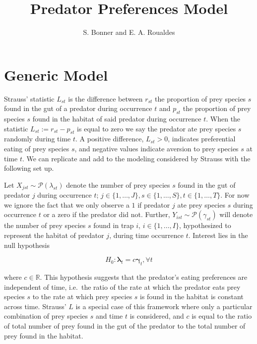 \documentclass[12pt]{article}\usepackage[]{graphicx}\usepackage[]{color}
\begin{document}
\title{Predator Preferences Model}
\author{S. Bonner and E. A. Roualdes}
\maketitle 



\section{Generic Model}
Strauss' statistic $L_{st}$ \cite{Strauss:1979} is the difference between $r_{st}$ the proportion of prey species $s$ found in the gut of a predator during occurrence $t$ and $p_{st}$ the proportion of prey species $s$ found in the habitat of said predator during occurrence $t$.  When the statistic $L_{st} := r_{st} - p_{st}$ is equal to zero we say the predator ate prey species $s$ randomly during time $t$.  A positive difference, $L_{st} > 0$, indicates preferential eating of prey species $s$, and negative values indicate aversion to prey species $s$ at time $t$.  We can replicate and add to the modeling considered by Strauss with the following set up.

Let $X_{jst} \sim \mathcal{P}(\lambda_{st})$ denote the number of prey species $s$ found in the gut of predator $j$ during occurrence $t$; $j \in \{1, \ldots, J\}, s \in \{1, \ldots, S\}, t \in \{1, \ldots, T\}$.  For now we ignore the fact that we only observe a $1$ if predator $j$ ate prey species $s$ during occurrence $t$ or a zero if the predator did not.  Further, $Y_{ist} \sim \mathcal{P}(\gamma_{st})$ will denote the number of prey species $s$ found in trap $i$, $i \in \{1, \ldots, I \}$, hypothesized to represent the habitat of predator $j$, during time occurrence $t$.  Interest lies in the null hypothesis

\begin{equation}
  \label{eq:null}
  H_0: \boldsymbol{\lambda}_t = c \boldsymbol{\gamma}_t, \forall t
\end{equation}

where $c \in \mathbb{R}$.  This hypothesis suggests that the predator's eating preferences are independent of time, i.e.\ the ratio of the rate at which the predator eats prey species $s$ to the rate at which prey species $s$ is found in the habitat is constant across time.  Strauss' $L$ is a special case of this framework where only a particular combination of prey species $s$ and time $t$ is considered, and $c$ is equal to the ratio of total number of prey found in the gut of the predator to the total number of prey found in the habitat.  
\end{document}
